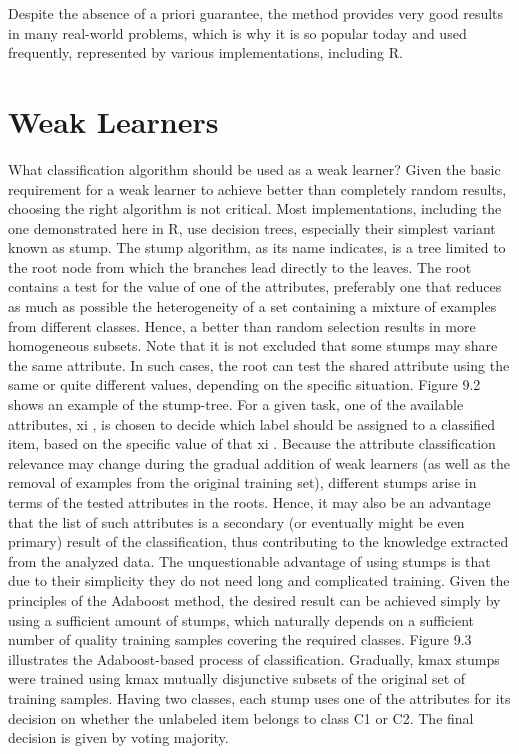 \documentclass[11pt,openany,executivepaper]{book}
\begin{document}
Despite the absence of a priori guarantee, the method provides very good
results in many real-world problems, which is why it is so popular today and
used frequently, represented by various implementations, including R.

\section{Weak Learners}
What classification algorithm should be used as a weak learner? Given the basic
requirement for a weak learner to achieve better than completely random results,
choosing the right algorithm is not critical. Most implementations, including the
one demonstrated here in R, use decision trees, especially their simplest variant
known as stump.
The stump algorithm, as its name indicates, is a tree limited to the root node
from which the branches lead directly to the leaves. The root contains a test for
the value of one of the attributes, preferably one that reduces as much as possible the heterogeneity of a set containing a mixture of examples from different
classes. Hence, a better than random selection results in more homogeneous subsets.
Note that it is not excluded that some stumps may share the same attribute. In
such cases, the root can test the shared attribute using the same or quite different
values, depending on the specific situation.
Figure 9.2 shows an example of the stump-tree. For a given task, one of the
available attributes, xi
, is chosen to decide which label should be assigned to
a classified item, based on the specific value of that xi
.
Because the attribute classification relevance may change during the gradual
addition of weak learners (as well as the removal of examples from the original
training set), different stumps arise in terms of the tested attributes in the roots.
Hence, it may also be an advantage that the list of such attributes is a secondary
(or eventually might be even primary) result of the classification, thus contributing to the knowledge extracted from the analyzed data.
The unquestionable advantage of using stumps is that due to their simplicity
they do not need long and complicated training. Given the principles of the Adaboost method, the desired result can be achieved simply by using a sufficient
amount of stumps, which naturally depends on a sufficient number of quality
training samples covering the required classes.
Figure 9.3 illustrates the Adaboost-based process of classification. Gradually,
kmax stumps were trained using kmax mutually disjunctive subsets of the original
set of training samples.
Having two classes, each stump uses one of the attributes for its decision on
whether the unlabeled item belongs to class C1 or C2. The final decision is given
by voting majority.
\end{document}
